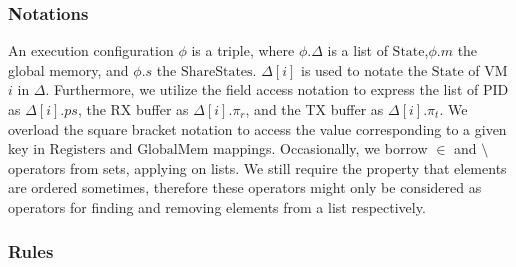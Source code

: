 \documentclass[a4paper]{article}
\newcommand*{\STATE}{\text{State}}
\newcommand*{\MEM}{\text{GlobalMem}}
\newcommand*{\SSS}{\text{ShareStates}}
\newcommand*{\PID}{\text{PID}}
\newcommand*{\REGS}{\text{Registers}}
\begin{document}
\subsubsection{Notations}
An execution configuration $\phi$ is a triple, where $\phi.\Delta$
is a list of $\STATE$,$\phi.m$ the global memory, and $\phi.s$ the $\SSS$. $\Delta[i]$ is used
to notate the $\STATE$ of VM $i$ in $\Delta$. Furthermore, we utilize the field
access notation to express the list of $\PID$ as $\Delta[i].ps$, the RX buffer as $\Delta[i].\pi_{r}$,
and the TX buffer as $\Delta[i].\pi_{t}$.
We overload the square bracket notation to access
the value corresponding to a given key in $\REGS$ and $\MEM$ mappings. Occasionally, we
borrow $\in$ and $\setminus$ operators from sets, applying on lists. We still require
the property that elements are ordered sometimes, therefore these
operators might only be considered as operators for finding
and removing elements from a list respectively.



\subsubsection{Rules}
\end{document}
